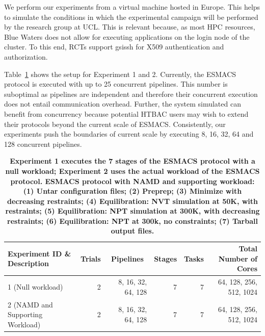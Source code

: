 We perform our experiments from a virtual machine hosted in Europe. This
helps to simulate the conditions in which the experimental campaign will be
performed by the research group at UCL\@. This is relevant because, as most
HPC resources, Blue Waters does not allow for executing applications on the
login node of the cluster. To this end, RCTs support \textmd{gsissh} for X509
authentication and authorization.

Table~\ref{tab:exp} shows the setup for Experiment 1 and 2. Currently, the
ESMACS protocol is executed with up to 25 concurrent pipelines. This number
is suboptimal as pipelines are independent and therefore their concurrent
execution does not entail communication overhead. Further, the system
simulated can benefit from concurrency because potential HTBAC users may wish
to extend their protocols beyond the current scale of ESMACS\@. Consistently,
our experiments push the boundaries of current scale by executing 8, 16, 32,
64 and 128 concurrent pipelines.

\begin{table}[t]
\centering
\caption{\bf Experiment 1 executes the 7 stages of the ESMACS protocol with
a null workload; Experiment 2 uses the actual workload of the ESMACS
protocol. ESMACS protocol with NAMD and supporting workload: (1) Untar
configuration files; (2) Preprep; (3) Minimize with decreasing restraints;
(4) Equilibration: NVT simulation at 50K, with restraints; (5) Equilibration:
NPT simulation at 300K, with decreasing restraints; (6) Equilibration: NPT at
300k, no constraints; (7) Tarball output files.}\label{tab:exp}
\begin{tabular}{lrrrrr}
\hline
\multicolumn{1}{l}{\textbf{Experiment ID \& Description}} & \multicolumn{1}{r}{\textbf{Trials}} & \multicolumn{1}{c}{\textbf{Pipelines}} & \multicolumn{1}{r}{\textbf{Stages}} & \multicolumn{1}{r}{\textbf{Tasks}} & \multicolumn{1}{r}{\textbf{Total Number of Cores}} \\ 
\hline
1 (Null workload)                                           & 2                           & 8, 16, 32, 64, 128             & 7                           & 7                          & 64, 128, 256, 512, 1024                    \\ %
2 (NAMD and Supporting Workload)                                       & 2                           & 8, 16, 32, 64, 128             & 7                           & 7                          & 64, 128, 256, 512, 1024                    \\ \hline
\end{tabular}
\end{table}


